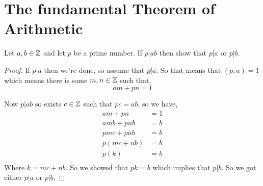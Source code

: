 \section{The fundamental Theorem of Arithmetic}
\begin{lemma}[Euclid]
Let $a, b  \in \mathbb{Z}$  and let  $p$ be a prime number. If $ p | ab$ then show that  $p | a$ or  $p | b$.
\end{lemma}
\begin{proof}
    If $p | a$ then we're done, so assume that  $ p \not | a$. So that means that  $(p, a) = 1$ which means there is some $m,n \in \mathbb{Z}$ such that,
    $$ am + pn = 1 $$ 

    Now $p | ab$ so exists  $c \in \mathbb{Z}$ such that  $pc = ab$, so we have, 
     \begin{align*}
         am + pn &= 1\\
         amb + pnb &= b\\
         pmc + pnb &= b\\
         p(mc + nb) &= b\\
         p(k) &= b\\
    \end{align*}
    Where $k = mc + nb$. So we showed that  $pk = b$ which implies that  $ p | b$. So we got either  $p | a$ or  $p | b$.
\end{proof}

